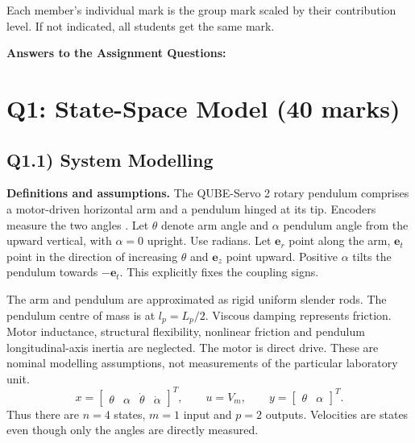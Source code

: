 \documentclass[11pt,a4paper]{article}
\begin{document}
\vspace{6pt}
{\small Each member's individual mark is the group mark scaled by their
contribution level. If not indicated, all students get the same mark.}

\vspace{10pt}

\begin{center}\large\bfseries Answers to the Assignment Questions:\end{center}


\section*{Q1: State-Space Model \hfill (40 marks)}
\subsection*{Q1.1) System Modelling}

\textbf{Definitions and assumptions.}
The QUBE-Servo 2 rotary pendulum comprises a motor-driven horizontal arm
and a pendulum hinged at its tip. Encoders measure the two angles
\cite{qube_manual}. Let $\theta$ denote arm angle and $\alpha$ pendulum
angle from the upward vertical, with $\alpha=0$ upright. Use radians.
Let $\boldsymbol e_r$ point along the arm, $\boldsymbol e_t$ point in the
direction of increasing $\theta$ and $\boldsymbol e_z$ point upward.
Positive $\alpha$ tilts the pendulum towards $-\boldsymbol e_t$.
This explicitly fixes the coupling signs.

The arm and pendulum are approximated as rigid uniform slender rods.
The pendulum centre of mass is at $l_p=L_p/2$. Viscous damping represents
friction. Motor inductance, structural flexibility, nonlinear friction
and pendulum longitudinal-axis inertia are neglected. The motor is direct
drive. These are nominal modelling assumptions, not measurements of
the particular laboratory unit.
\begin{equation}
x=\begin{bmatrix}\theta&\alpha&\dot\theta&\dot\alpha\end{bmatrix}^{T},
\qquad u=V_m,\qquad y=\begin{bmatrix}\theta&\alpha\end{bmatrix}^{T}.
\end{equation}
Thus there are $n=4$ states, $m=1$ input and $p=2$ outputs. Velocities
are states even though only the angles are directly measured.
\end{document}
